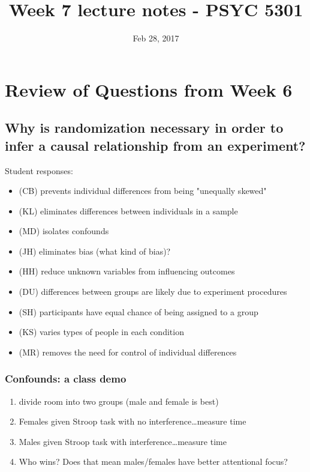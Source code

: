 \documentclass[11pt]{article}
\date{Feb 28, 2017}
\title{Week 7 lecture notes - PSYC 5301}
\begin{document}
\maketitle
\section*{Review of Questions from Week 6}
\label{sec-1}

\subsection*{Why is randomization necessary in order to infer a causal relationship from an experiment?}
\label{sec-1-1}

Student responses:
\begin{itemize}
\item (CB) prevents individual differences from being "unequally skewed"
\item (KL) eliminates differences between individuals in a sample
\item (MD) isolates confounds
\item (JH) eliminates bias (what kind of bias)?
\item (HH) reduce unknown variables from influencing outcomes
\item (DU) differences between groups are likely due to experiment procedures
\item (SH) participants have equal chance of being assigned to a group
\item (KS) varies types of people in each condition
\item (MR) removes the need for control of individual differences
\end{itemize}

\subsubsection*{Confounds: a class demo}
\label{sec-1-1-1}

\begin{enumerate}
\item divide room into two groups (male and female is best)
\item Females given Stroop task with no interference\ldots{}measure time
\item Males given Stroop task with interference\ldots{}measure time
\item Who wins?  Does that mean males/females have better attentional focus?
\end{enumerate}
\end{document}
